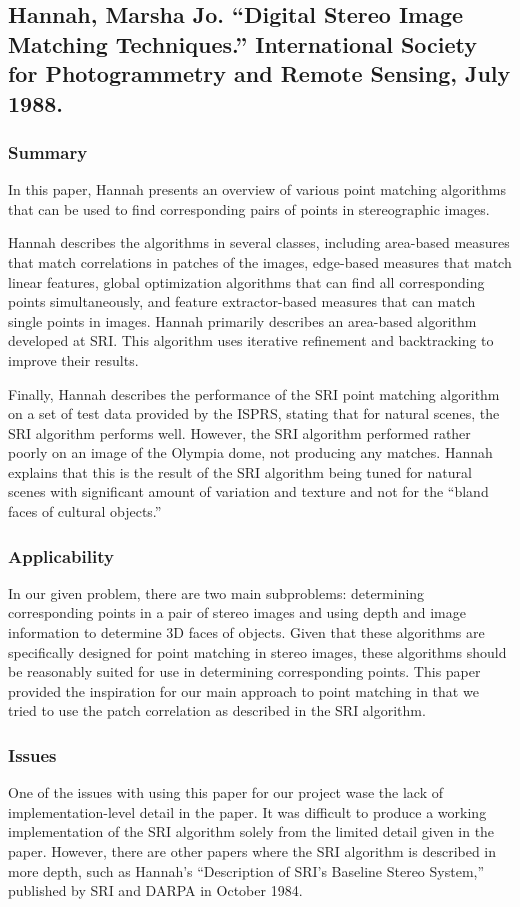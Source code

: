 \subsection{Hannah, Marsha Jo. ``Digital Stereo Image Matching Techniques.'' International Society for Photogrammetry and Remote Sensing, July 1988.}

\subsubsection{Summary}
In this paper, Hannah presents an overview of various point matching algorithms that can be used to find corresponding pairs of points in stereographic images. 

Hannah describes the algorithms in several classes, including area-based measures that match correlations in patches of the images, edge-based measures that match linear features, global optimization algorithms that can find all corresponding points simultaneously, and feature extractor-based measures that can match single points in images. Hannah primarily describes an area-based algorithm developed at SRI. This algorithm uses iterative refinement and backtracking to improve their results. 

Finally, Hannah describes the performance of the SRI point matching algorithm on a set of test data provided by the ISPRS, stating that for natural scenes, the SRI algorithm performs well. However, the SRI algorithm performed rather poorly on an image of the Olympia dome, not producing any matches. Hannah explains that this is the result of the SRI algorithm being tuned for natural scenes with significant amount of variation and texture and not for the ``bland faces of cultural objects.''

\subsubsection{Applicability}
In our given problem, there are two main subproblems: determining corresponding points in a pair of stereo images and using depth and image information to determine 3D faces of objects. Given that these algorithms are specifically designed for point matching in stereo images, these algorithms should be reasonably suited for use in determining corresponding points. This paper provided the inspiration for our main approach to point matching in that we tried to use the patch correlation as described in the SRI algorithm.

\subsubsection{Issues}
One of the issues with using this paper for our project wase the lack of implementation-level detail in the paper. It was difficult to produce a working implementation of the SRI algorithm solely from the limited detail given in the paper. However, there are other papers where the SRI algorithm is described in more depth, such as Hannah's ``Description of SRI's Baseline Stereo System,'' published by SRI and DARPA in October 1984. 

